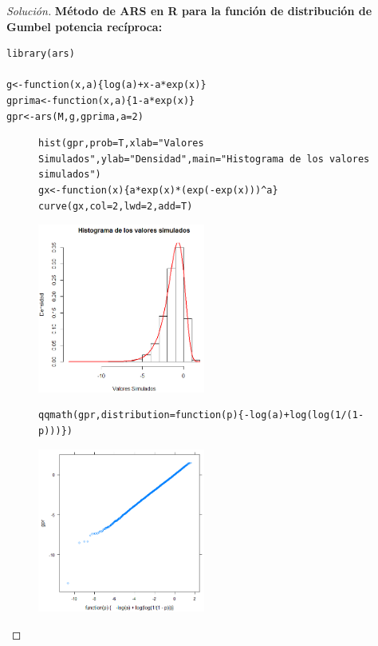 \documentclass[11pt]{article}
\renewcommand{\=}[1]{\stackrel{#1}{=}} %
\newenvironment{sol}
{\begin{proof}[Solución]}
	{\end{proof}}
\theoremstyle{definition}
\theoremstyle{remark}
\begin{document}
\begin{itemize}
\begin{sol}
{\bf Método de ARS en R para la función de distribución de Gumbel potencia recíproca:}
{
	\begin{lstlisting}[style=myRstyle, caption={Algoritmo ARS / GUMBEL POTENCIA RECÍPROCO.}]
library(ars)
	
g<-function(x,a){log(a)+x-a*exp(x)}
gprima<-function(x,a){1-a*exp(x)}
gpr<-ars(M,g,gprima,a=2)
	\end{lstlisting}
}

\newpage
\begin{figure}[h]
	\hspace*{0.9cm}\begin{minipage}{10cm}
		{
			\begin{lstlisting}[style=myRstyle, caption={Verificación mediante histograma / GUMBEL POTENCIA RECÍPROCO.}]
hist(gpr,prob=T,xlab="Valores Simulados",ylab="Densidad",main="Histograma de los valores simulados")
gx<-function(x){a*exp(x)*(exp(-exp(x)))^a}
curve(gx,col=2,lwd=2,add=T)
			\end{lstlisting}
		}			
	\end{minipage}
	\begin{minipage}{6cm}
		\includegraphics[width=5.5cm]{mi4}
	\end{minipage}
\end{figure}
\begin{figure}[h]
	\hspace*{0.9cm}\begin{minipage}{10cm}
		{
			\begin{lstlisting}[style=myRstyle, caption={Verificación mediante gráfica de cuantiles / GUMBEL POTENCIA RECÍPROCO.}]
qqmath(gpr,distribution=function(p){-log(a)+log(log(1/(1-p)))})
			\end{lstlisting}
		}			
	\end{minipage}
	\begin{minipage}{6cm}
		\includegraphics[width=5.5cm]{mi5}
	\end{minipage}
\end{figure}


\end{sol}
\end{itemize}
\end{document}

